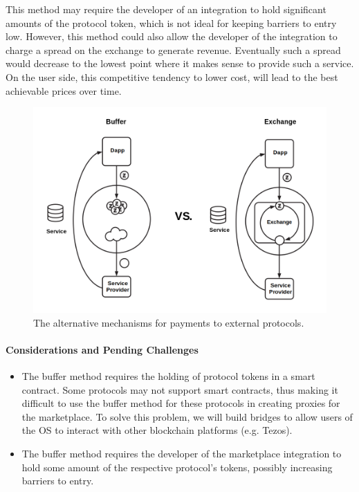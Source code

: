 \documentclass[]{article}
\makeatletter
\let\oldparagraph\paragraph
\renewcommand{\paragraph}[1]{\oldparagraph{#1}\mbox{}}
\DeclareRobustCommand{\_}{%
  \leavevmode\vbox{%
    \hrule\@width.5em
          \@height-.26ex
          \@depth\dimexpr.26ex+.28pt\relax}}
\makeatother
\begin{document}
This method may require the developer of an integration to hold
significant amounts of the protocol token, which is not ideal for
keeping barriers to entry low. However, this method could also allow the
developer of the integration to charge a spread on the exchange to
generate revenue. Eventually such a spread would decrease to the lowest
point where it makes sense to provide such a service. On the user side,
this competitive tendency to lower cost, will lead to the best
achievable prices over time.

\begin{figure}
  \centering
  \includegraphics[width=0.65\linewidth]{images/image3}
  \caption{The alternative mechanisms for payments to external protocols.}
\end{figure}

\paragraph{Considerations and Pending Challenges}

\begin{itemize}

  \item
    The buffer method requires the holding of protocol tokens in a smart
    contract. Some protocols may not support smart contracts, thus making it
    difficult to use the buffer method for these protocols in creating proxies
    for the marketplace. To solve this problem, we will build bridges to allow
    users of the OS to interact with other blockchain platforms (e.g. Tezos).

  \item
    The buffer method requires the developer of the marketplace integration to
    hold some amount of the respective protocol's tokens, possibly increasing
    barriers to entry.

\end{itemize}
\end{document}
